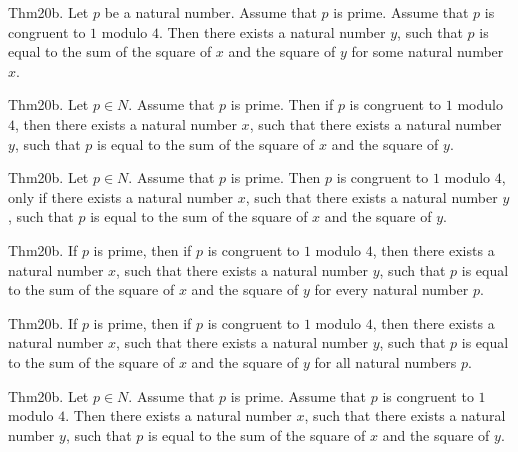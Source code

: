 \documentclass{article}
\begin{document}
Thm20b. Let $p$ be a natural number. Assume that $p$ is prime. Assume that $p$ is congruent to $1$ modulo $4$. Then there exists a natural number $y$, such that $p$ is equal to the sum of the square of $x$ and the square of $y$ for some natural number $x$.

Thm20b. Let $p \in N$. Assume that $p$ is prime. Then if $p$ is congruent to $1$ modulo $4$, then there exists a natural number $x$, such that there exists a natural number $y$, such that $p$ is equal to the sum of the square of $x$ and the square of $y$.

Thm20b. Let $p \in N$. Assume that $p$ is prime. Then $p$ is congruent to $1$ modulo $4$, only if there exists a natural number $x$, such that there exists a natural number $y$, such that $p$ is equal to the sum of the square of $x$ and the square of $y$.

Thm20b. If $p$ is prime, then if $p$ is congruent to $1$ modulo $4$, then there exists a natural number $x$, such that there exists a natural number $y$, such that $p$ is equal to the sum of the square of $x$ and the square of $y$ for every natural number $p$.

Thm20b. If $p$ is prime, then if $p$ is congruent to $1$ modulo $4$, then there exists a natural number $x$, such that there exists a natural number $y$, such that $p$ is equal to the sum of the square of $x$ and the square of $y$ for all natural numbers $p$.

Thm20b. Let $p \in N$. Assume that $p$ is prime. Assume that $p$ is congruent to $1$ modulo $4$. Then there exists a natural number $x$, such that there exists a natural number $y$, such that $p$ is equal to the sum of the square of $x$ and the square of $y$.
\end{document}
